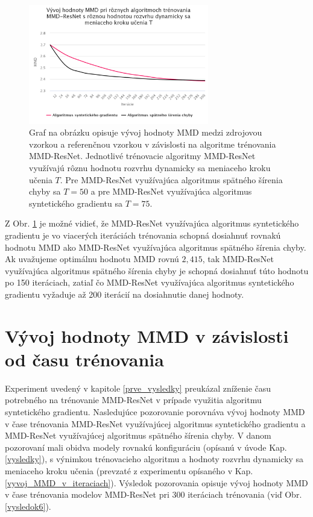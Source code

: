 \begin{figure}
\centerline{\includegraphics[width=0.7\textwidth]{images/experimenty/experiment5.png}}
\caption[Vývoj hodnoty MMD pri rôznych algoritmoch trénovania MMD-ResNet s rôznou hodnotou rozvrhu dynamicky sa meniaceho kroku učenia $T$]{Graf na obrázku opisuje vývoj hodnoty MMD medzi zdrojovou vzorkou a referenčnou vzorkou v závislosti na algoritme trénovania MMD-ResNet. Jednotlivé trénovacie algoritmy MMD-ResNet využívajú rôznu hodnotu rozvrhu dynamicky sa meniaceho kroku učenia $T$. Pre MMD-ResNet využívajúca algoritmus spätného šírenia chyby sa $T=50$ a pre MMD-ResNet využívajúca algoritmus syntetického gradientu sa $T=75$.}
\label{vysledok5}
\end{figure}

Z Obr. \ref{vysledok5} je možné vidieť, že MMD-ResNet využívajúca algoritmus syntetického gradientu je vo viacerých iteráciách trénovania schopná dosiahnuť rovnakú hodnotu MMD ako MMD-ResNet využívajúca algoritmus spätného šírenia chyby. Ak uvažujeme optimálnu hodnotu MMD rovnú $2,415$, tak MMD-ResNet využívajúca algoritmus spätného šírenia chyby je schopná dosiahnuť túto hodnotu po 150 iteráciach, zatiaľ čo MMD-ResNet využívajúca algoritmus syntetického gradientu vyžaduje až 200 iterácií na dosiahnutie danej hodnoty.

\section{Vývoj hodnoty MMD v závislosti od času trénovania}
\label{vyvoj_MMD_v_case}

Experiment uvedený v kapitole \ref{prve_vysledky} preukázal zníženie času potrebného na trénovanie MMD-ResNet v prípade využitia algoritmu syntetického gradientu. Nasledujúce pozorovanie porovnáva vývoj hodnoty MMD v čase trénovania MMD-ResNet využívajúcej algoritmus syntetického gradientu a MMD-ResNet využívajúcej algoritmus spätného šírenia chyby. V danom pozorovaní mali obidva modely rovnakú konfiguráciu (opísanú v úvode Kap. \ref{vysledky}), s výnimkou trénovacieho algoritmu a hodnoty rozvrhu dynamicky sa meniaceho kroku učenia (prevzaté z experimentu opísaného v Kap. \ref{vyvoj_MMD_v_iteraciach}). Výsledok pozorovania opisuje vývoj hodnoty MMD v čase trénovania modelov MMD-ResNet pri 300 iteráciach trénovania (viď Obr. \ref{vysledok6}).

